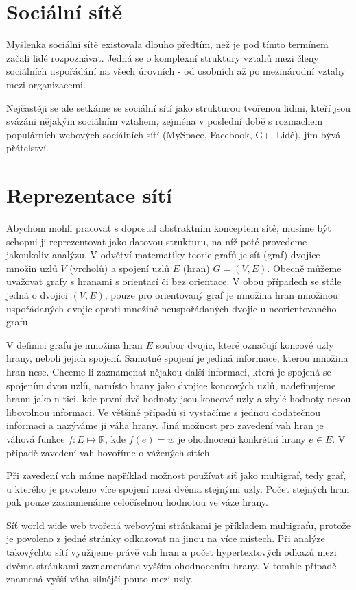 \documentclass[12pt,titlepage]{report}
\begin{document}
\section{Sociální sítě}
Myšlenka sociální sítě existovala dlouho předtím, než je pod tímto termínem
začali lidé rozpoznávat. Jedná se o komplexní struktury vztahů mezi členy
sociálních uspořádání na všech úrovních - od osobních až po mezinárodní vztahy
mezi organizacemi.

Nejčastěji se ale setkáme se sociální sítí jako strukturou tvořenou lidmi,
kteří jsou svázáni nějakým sociálním vztahem, zejména v poslední době s
rozmachem populárních webových sociálních sítí (MySpace, Facebook, G+, Lidé),
jím bývá přátelství.

\section{Reprezentace sítí}
Abychom mohli pracovat s doposud abstraktním konceptem sítě, musíme být schopni
ji reprezentovat jako datovou strukturu, na níž poté provedeme jakoukoliv
analýzu.
V odvětví matematiky teorie grafů je síť (graf) dvojice množin uzlů $V$
(vrcholů) a spojení uzlů $E$ (hran) $G = (V, E)$.  Obecně můžeme uvažovat grafy
s hranami s orientací či bez orientace. V obou případech se stále jedná o
dvojici $(V, E)$, pouze pro orientovaný graf je množina hran množinou
uspořádaných dvojic oproti množině neuspořádaných dvojic u neorientovaného
grafu.

V definici grafu je množina hran $E$ soubor dvojic, které označují koncové uzly
hrany, neboli jejich spojení. Samotné spojení je jediná informace, kterou
množina hran nese. Chceme-li zaznamenat nějakou další informaci, která je
spojená se spojením dvou uzlů, namísto hrany jako dvojice koncových uzlů,
nadefinujeme hranu jako n-tici, kde první dvě hodnoty jsou koncové uzly a zbylé
hodnoty nesou libovolnou informaci. Ve většině případů si vystačíme s jednou
dodatečnou informací a nazýváme ji váha hrany. Jiná možnost pro zavedení vah
hran je váhová funkce $f: E \mapsto \mathbb{R}$, kde $f(e) = w$ je ohodnocení
konkrétní hrany $e \in E$. V případě zavedení vah hovoříme o vážených sítích.

Při zavedení vah máme například možnost používat síť jako multigraf, tedy graf,
u kterého je povoleno více spojení mezi dvěma stejnými uzly. Počet stejných
hran pak pouze zaznamenáme celočíselnou hodnotou ve váze hrany.

Síť world wide web tvořená webovými stránkami je příkladem
multigrafu, protože je povoleno z jedné stránky odkazovat na jinou na více
místech. Při analýze takovýchto sítí využijeme právě vah hran a počet
hypertextových odkazů mezi dvěma stránkami zaznamenáme vyšším ohodnocením
hrany. V tomhle případě znamená vyšší váha silnější pouto mezi uzly.
\end{document}
